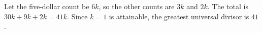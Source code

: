 Let the five-dollar count be $6k$, so the other counts are $3k$ and $2k$. The total is $30k+9k+2k=41k$. Since $k=1$ is attainable, the greatest universal divisor is $\boxed{41}$.
